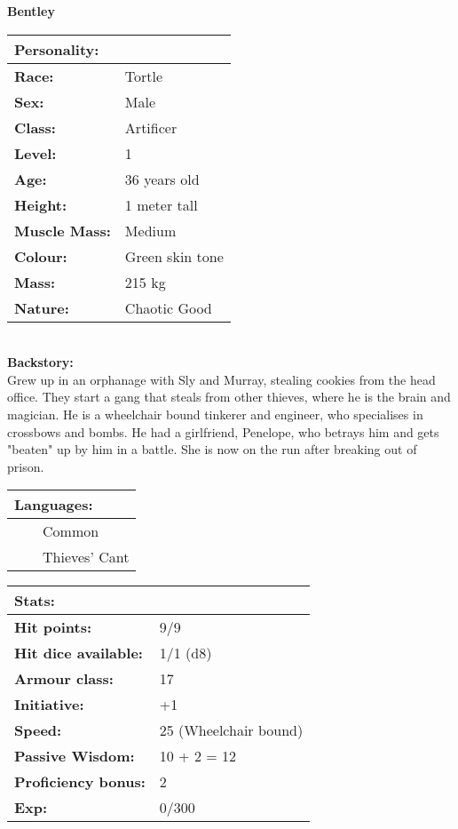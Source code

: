 \documentclass[11pt]{article}
\newcommand{\tabitem}{~~\llap{--}~~}
\begin{document}
	\begin{center}
\Huge \textbf{Bentley}
	\end{center}
	\begin{multicols}{2}
\noindent \begin{tabularx}{95mm}{@{}l l}
\Large \textbf{Personality:} 	& 						\\
\hline
\textbf{Race:} 					& Tortle		 		\\
\textbf{Sex:} 					& Male 					\\
\textbf{Class:}					& Artificer				\\
\textbf{Level:} 				& 1						\\
\textbf{Age:} 					& 36 years old			\\
\textbf{Height:} 				& 1 meter tall	 		\\
\textbf{Muscle Mass:} 			& Medium 				\\
\textbf{Colour:} 				& Green skin tone	 	\\
\textbf{Mass:} 					& 215 kg				\\
\textbf{Nature:} 				& Chaotic Good
		\end{tabularx} \\
\textbf{Backstory:} \\
Grew up in an orphanage with Sly and Murray, stealing cookies from the head office. They start a gang that steals from other thieves, where he is the brain and magician. He is a wheelchair bound tinkerer and engineer, who specialises in crossbows and bombs. He had a girlfriend, Penelope, who betrays him and gets "beaten" up by him in a battle. She is now on the run after breaking out of prison.

\noindent \begin{tabularx}{95mm}{@{}l}
{\Large \textbf{Languages:}} \\
\hline
\tabitem Common \\
\tabitem Thieves' Cant
		\end{tabularx}

\vspace{4mm}

\noindent \begin{tabularx}{95mm}{@{}l l}
\Large \textbf{Stats:}		 	& 									\\
\hline
\textbf{Hit points:} 			& 9/9					 			\\
\textbf{Hit dice available:}	& 1/1 (d8)							\\
\textbf{Armour class:} 			& 17					 	\\
\textbf{Initiative:} 			& +1								\\
\textbf{Speed:} 				& 25 (Wheelchair bound)				\\
\textbf{Passive Wisdom:} 		& 10 + 2 = 12	 					\\
\textbf{Proficiency bonus:}		& 2									\\
\textbf{Exp:} 					& 0/300
		\end{tabularx}


\end{multicols}
\end{document}
